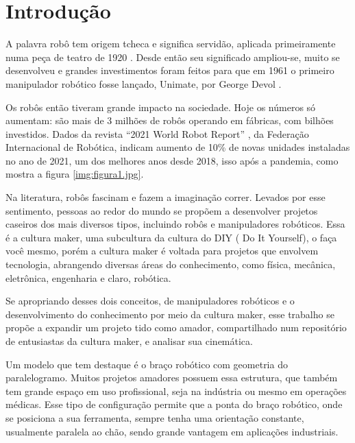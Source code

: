 \chapter{Introdução}

A palavra robô tem origem tcheca e significa servidão, aplicada primeiramente numa peça de  teatro de 1920 \cite{Spong2020}. Desde então seu significado ampliou-se, muito se desenvolveu e grandes investimentos foram feitos para que em 1961 o primeiro manipulador robótico fosse lançado, Unimate, por George Devol \cite{Granatyr2017a}.

Os robôs então tiveram grande impacto na sociedade. Hoje os números só aumentam: são mais de 3 milhões de robôs operando em fábricas, com bilhões investidos. Dados da revista “2021 World Robot Report” \cite{Heer2021a}, da Federação Internacional de Robótica, indicam aumento de 10\% de novas unidades instaladas no ano de 2021, um dos melhores anos desde 2018, isso após a pandemia, como mostra a figura \ref{img:figura1.jpg}.


Na literatura, robôs fascinam e fazem a imaginação correr. Levados por esse sentimento, pessoas ao redor do mundo  se propõem a desenvolver projetos caseiros dos mais diversos tipos, incluindo robôs e manipuladores robóticos. Essa é a cultura maker, uma subcultura da cultura do DIY ( Do It Yourself), o faça você mesmo, porém a cultura maker é voltada para projetos que envolvem tecnologia, abrangendo diversas áreas do conhecimento, como física, mecânica, eletrônica, engenharia e claro, robótica. \cite{Marini2019a}

Se apropriando desses dois conceitos, de manipuladores robóticos e o desenvolvimento do conhecimento por meio da cultura maker, esse trabalho se propõe a expandir um projeto tido como amador, compartilhado num repositório de entusiastas da cultura maker, e analisar sua cinemática.

Um modelo que tem destaque é o braço robótico com geometria do paralelogramo. Muitos projetos amadores possuem essa estrutura, que também tem grande espaço em uso profissional, seja na indústria ou mesmo em operações médicas. Esse tipo de configuração permite que a ponta do braço robótico, onde se posiciona a sua ferramenta, sempre tenha uma orientação constante, usualmente paralela ao chão, sendo grande vantagem em aplicações industriais.

